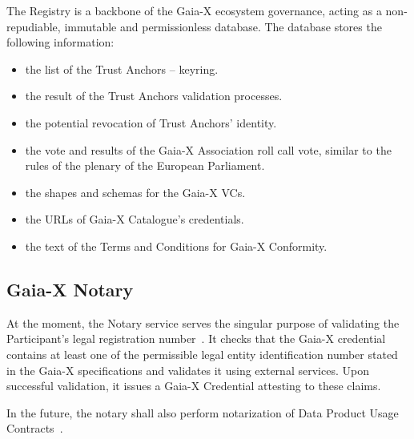 The Registry is a backbone of the Gaia-X ecosystem governance, acting as a non-repudiable, immutable and permissionless database\cite{gaiax_trust_framework}.
The database stores the following information:
\begin{itemize}
    \item the list of the Trust Anchors – keyring.
    \item the result of the Trust Anchors validation processes.
    \item the potential revocation of Trust Anchors' identity.
    \item the vote and results of the Gaia-X Association roll call vote, similar to the rules of the plenary of the European Parliament.
    \item the shapes and schemas for the Gaia-X VCs.
    \item the URLs of Gaia-X Catalogue’s credentials.
    \item the text of the Terms and Conditions for Gaia-X Conformity.
\end{itemize}

\subsection{Gaia-X Notary}\label{subsec:gaia-x-notary}

At the moment, the Notary service serves the singular purpose of validating the Participant's legal registration number~\cite{gaiax_trust_framework}.
It checks that the Gaia-X credential contains at least one of the permissible legal entity identification number stated in the Gaia-X specifications and validates it using external services.
Upon successful validation, it issues a Gaia-X Credential attesting to these claims.

In the future, the notary shall also perform notarization of Data Product Usage Contracts~\cite{gaiax_data_exchange_document}.
